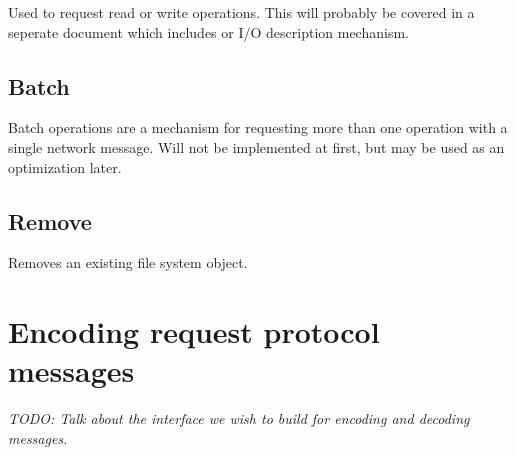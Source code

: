 \documentclass[11pt, letterpaper]{article} %
\begin{document}
Used to request read or write operations.  This will probably be covered
in a seperate document which includes or I/O description mechanism.

\subsection{Batch}

Batch operations are a mechanism for requesting more than one operation
with a single network message.  Will not be implemented at first, but
may be used as an optimization later.

\subsection{Remove}

Removes an existing file system object.

\section{Encoding request protocol messages}

\emph{TODO: Talk about the interface we wish to build for encoding
and decoding messages.}
\end{document}
